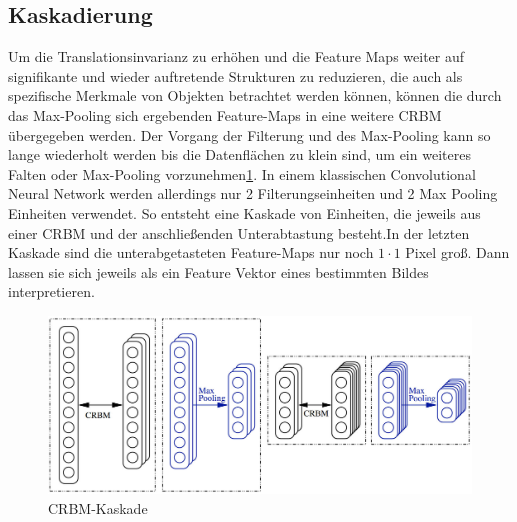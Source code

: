 \subsection{Kaskadierung}
Um die Translationsinvarianz zu erhöhen und die Feature Maps weiter auf signifikante und wieder auftretende Strukturen zu reduzieren, die auch als spezifische Merkmale von Objekten betrachtet werden können, können die durch das Max-Pooling sich ergebenden Feature-Maps in eine weitere CRBM übergegeben werden. 
Der Vorgang der Filterung und des Max-Pooling kann so lange wiederholt werden bis die Datenflächen zu klein sind, um ein weiteres Falten oder Max-Pooling vorzunehmen\ref{cascade}. In einem klassischen Convolutional Neural Network werden allerdings nur 2 Filterungseinheiten und 2 Max Pooling Einheiten verwendet. So entsteht eine Kaskade von Einheiten, die jeweils aus einer CRBM und der anschließenden Unterabtastung besteht.\newline In der letzten Kaskade sind die unterabgetasteten Feature-Maps nur noch $1 \cdot 1$ Pixel groß. Dann lassen sie sich jeweils als ein Feature Vektor eines bestimmten Bildes interpretieren.\newline
\begin{figure}[]
                \centering
                \includegraphics[width=2.0\columnwidth]{images/stack.jpg}
                \caption{CRBM-Kaskade \cite{Norouzi09}}
                \label{cascade}
\end{figure}
